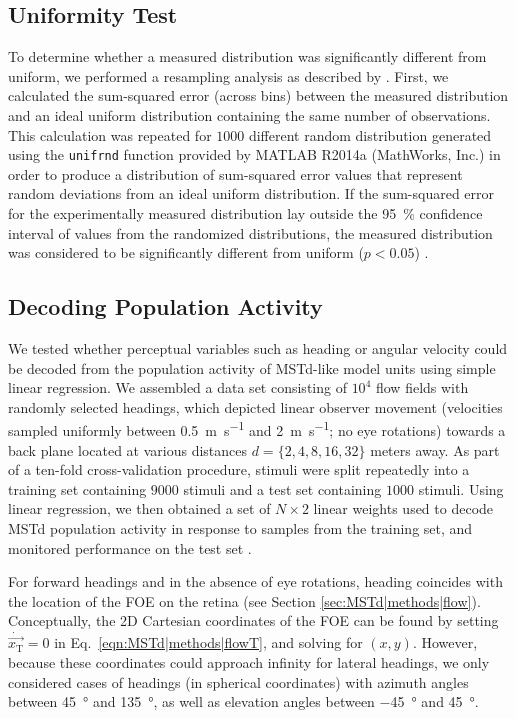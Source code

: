 \subsection{Uniformity Test}
\label{sec:MSTd|methods|uniformity}
To determine whether a measured distribution was significantly different 
from uniform, we performed a resampling analysis as described by 
\cite{Takahashi2007}. First, we calculated the sum-squared error (across bins)
between the measured distribution and an ideal uniform distribution containing 
the same number of observations. This calculation was repeated for $1000$
different random distribution generated using the \texttt{unifrnd} function
provided by MATLAB R2014a (MathWorks, Inc.) in order to produce a distribution 
of sum-squared error values that represent random deviations from an ideal 
uniform distribution. If the sum-squared error for the experimentally measured
distribution lay outside the \SI{95}{\percent} confidence interval of values
from the randomized distributions, the measured distribution was considered 
to be significantly different from uniform ($p<0.05$)
\citep{Takahashi2007}.


\subsection{Decoding Population Activity}
\label{sec:MSTd|methods|popact}
We tested whether perceptual variables such as heading or angular velocity 
could be decoded from the population activity of \ac{MSTd}-like model units 
using simple linear regression. We assembled a data set consisting of
$10^4$ flow fields with randomly selected headings, which depicted linear
observer movement (velocities sampled uniformly between 
\SI{0.5}{\meter\per\second} and \SI{2}{\meter\per\second}; no eye rotations)
towards a back plane located at various distances $d=\{2,4,8,16,32\}$ meters
away. As part of a ten-fold cross-validation procedure, stimuli were split
repeatedly into a training set containing $9000$ stimuli and a test set 
containing $1000$ stimuli. Using linear regression, we then obtained a set 
of $N \times 2$ linear weights used to decode \ac{MSTd} population activity
in response to samples from the training set, and monitored performance on 
the test set \citep{PicardCook1984}.

For forward headings and in the absence of eye rotations, heading coincides 
with the location of the \ac{FOE} on the retina 
(see Section \ref{sec:MSTd|methods|flow}).
Conceptually, the 2D Cartesian coordinates of the \ac{FOE} can be found by 
setting $\dot{\vec{x_{\textrm{T}}}} = 0$ in Eq.~\ref{eqn:MSTd|methods|flowT},
and solving for $(x,y)$. However, because these coordinates could approach 
infinity for lateral headings, we only considered cases of headings 
(in spherical coordinates) with azimuth angles between \SI{45}{\degree} and
\SI{135}{\degree}, as well as elevation angles between \SI{-45}{\degree} and
\SI{+45}{\degree}.

